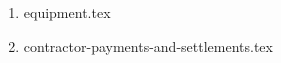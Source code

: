 \begin{enumerate}
    \item {equipment.tex}
    \item {contractor-payments-and-settlements.tex}
\end{enumerate}